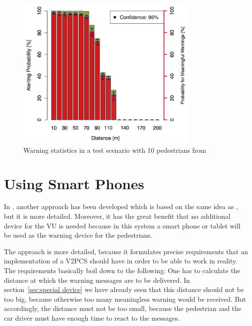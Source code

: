 \documentclass[]{ccs-thesis}
\begin{document}
\begin{figure}[h]
	\centering
	\includegraphics[width=0.8\textwidth]{figures/3_chart}
	\caption{Warning statistics in a test scenario with 10 pedestrians from \cite{v2pprotection}}%
	\label{fig:chart2}%
\end{figure}


\section{Using Smart Phones}\label{sec:smartphone}

In \cite{v2pcomm}, another approach has been developed which is based on the same idea as \cite{v2pprotection}, but it is more detailed. Moreover, it has the great benefit that no additional device for the \ac{VU} is needed because in this system a smart phone or tablet will be used as the warning device for the pedestrians.

The approach is more detailed, because it formulates precise requirements that an implementation of a \ac{V2PCS} should have in order to be able to work in reality. The  requirements basically boil down to the following: One has to calculate the distance at which the warning messages are to be delivered. In section~\ref{sec:special device} we have already seen that this distance should not be too big, because otherwise too many meaningless warning would be received. But accordingly, the distance must not be too small, because the pedestrian and the car driver must have enough time to react to the messages.
\end{document}

